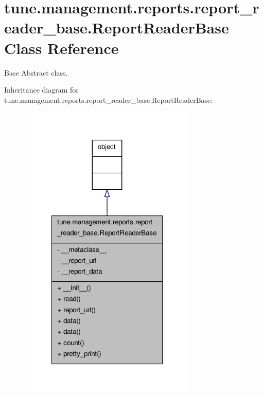 \hypertarget{classtune_1_1management_1_1reports_1_1report__reader__base_1_1ReportReaderBase}{\section{tune.\-management.\-reports.\-report\-\_\-reader\-\_\-base.\-Report\-Reader\-Base Class Reference}
\label{classtune_1_1management_1_1reports_1_1report__reader__base_1_1ReportReaderBase}
}


Base Abstract class.  




Inheritance diagram for tune.\-management.\-reports.\-report\-\_\-reader\-\_\-base.\-Report\-Reader\-Base\-:
\nopagebreak
\begin{figure}[H]
\begin{center}
\leavevmode
\includegraphics[width=240pt]{classtune_1_1management_1_1reports_1_1report__reader__base_1_1ReportReaderBase__inherit__graph}
\end{center}
\end{figure}



